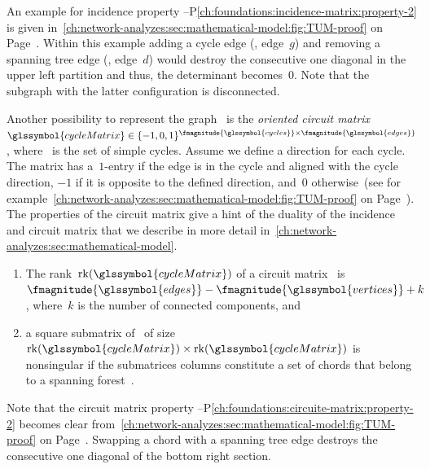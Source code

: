 % 
An example for incidence property
--P\ref{ch:foundations:incidence-matrix:property-2}
is given in~\cref{ch:network-analyzes:sec:mathematical-model:fig:TUM-proof} on
Page~\pageref{ch:network-analyzes:sec:mathematical-model:fig:TUM-proof}. Within
this example adding a cycle edge (\eg, edge~$g$) and removing a spanning tree
edge (\eg, edge~$d$) would destroy the consecutive one diagonal in the upper
left partition and thus, the determinant becomes~$0$. Note that the subgraph
with the latter configuration is disconnected.

Another possibility to represent the graph~ is the
\emph{oriented circuit matrix}~$
    \glssymbol{cycleMatrix}
    \in
    \{-1,0,1\}^{
        \fmagnitude{\glssymbol{cycles}}
        \times 
        \fmagnitude{\glssymbol{edges}}
    }
$, where~ is the set of simple cycles. Assume we define a
direction for each cycle. The matrix has a~$1$-entry if the edge is in the cycle
and aligned with the cycle direction, $-1$ if it is opposite to the defined
direction, and~$0$ otherwise~(see for
example~\cref{ch:network-analyzes:sec:mathematical-model:fig:TUM-proof} on
Page~\pageref{ch:network-analyzes:sec:mathematical-model:fig:TUM-proof}). The
properties of the circuit matrix give a hint of the duality of the incidence and
circuit matrix that we describe in more detail
in~\cref{ch:network-analyzes:sec:mathematical-model}.
% 
\begin{enumerate}
  \item The rank~$\rank(\glssymbol{cycleMatrix})$ of a circuit
        matrix~ is~$
            \fmagnitude{\glssymbol{edges}} 
            -
            \fmagnitude{\glssymbol{vertices}} 
            + k
        $, where~$k$ is the number of connected components, and
        \label{ch:foundations:circuite-matrix:property-1}
  \item a square submatrix of~ of size~$\rank
        (\glssymbol{cycleMatrix})\times\rank(\glssymbol{cycleMatrix})$ is
        nonsingular if the submatrices columns constitute a set of chords
        that belong to a spanning forest~\forest.
  \label{ch:foundations:circuite-matrix:property-2}
\end{enumerate}
% 
Note that the circuit matrix property
--P\ref{ch:foundations:circuite-matrix:property-2}
becomes clear
from~\cref{ch:network-analyzes:sec:mathematical-model:fig:TUM-proof} on
Page~\pageref{ch:network-analyzes:sec:mathematical-model:fig:TUM-proof}.
Swapping a chord with a spanning tree edge destroys the consecutive one diagonal
of the bottom right section. 

